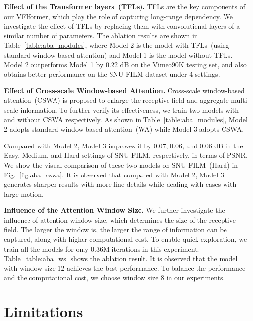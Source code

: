 \documentclass[10pt,twocolumn,letterpaper]{article}
\begin{document}
		\vspace{0.05in}
	\noindent\textbf{Effect of the Transformer layers~(TFLs).} TFLs are the key components of our VFIformer, which play the role of capturing long-range dependency. We investigate the effect of TFLs by replacing them with convolutional layers of a similar number of parameters. The ablation results are shown in Table~\ref{table:aba_modules}, where Model 2 is the model with TFLs~(using standard window-based attention) and Model 1 is the model without TFLs.
	Model 2 outperforms Model 1 by 0.22 dB on the Vimeo90K testing set, and also obtains better performance on the SNU-FILM dataset under 4 settings.
	
	
		\vspace{0.05in}
	\noindent\textbf{Effect of Cross-scale Window-based Attention. } Cross-scale window-based attention~(CSWA) is proposed to enlarge the receptive field and aggregate multi-scale information. 
	To further verify its effectiveness, we train two models with and without CSWA respectively. As shown in Table~\ref{table:aba_modules}, Model 2 adopts standard window-based attention~(WA) while Model 3 adopts CSWA.
	
	Compared with Model 2, Model 3 improves it by 0.07, 0.06, and 0.06 dB in the Easy, Medium, and Hard settings of SNU-FILM, respectively, in terms of PSNR. 
	We show the visual comparison of these two models on SNU-FILM~(Hard) in Fig.~\ref{fig:aba_cswa}. It is observed that compared with Model 2, Model 3 generates sharper results with more fine details while dealing with cases with large motion.


	
		\vspace{0.05in}
	\noindent\textbf{Influence of the Attention Window Size. } We further investigate the influence of attention window size, which determines the size of the receptive field. The larger the window is, the larger the range of information can be captured, along with higher computational cost. To enable quick exploration, we train all the models for only 0.36M iterations in this experiment. Table~\ref{table:aba_ws} shows the ablation result. It is observed that the model with window size 12 achieves the best performance. To balance the performance and the computational cost, we choose window size 8 in our experiments.
	
	
	
	
\section{Limitations}
	
\end{document}

